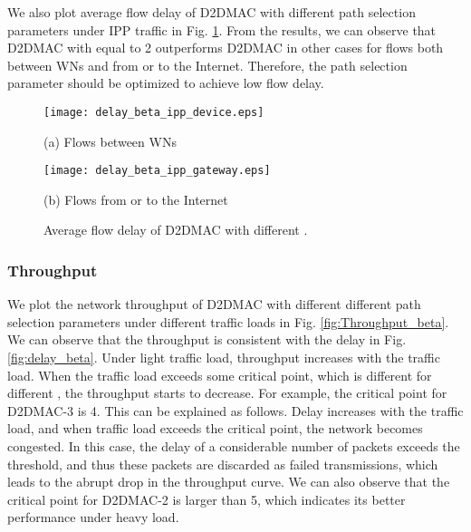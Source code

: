 \documentclass[journal]{IEEEtran}
\begin{document}
We also plot average flow delay of D2DMAC with different path selection parameters under IPP
traffic in Fig. \ref{fig:delay_beta_ipp_flow}. From the results, we can observe that D2DMAC with
 equal to 2 outperforms D2DMAC in other cases for flows both between WNs and from or to the
Internet. Therefore, the path selection parameter should be optimized to achieve low flow delay.




\begin{figure}[htbp]
\begin{minipage}[t]{0.5\linewidth}
\centering
\texttt{[image: delay\_beta\_ipp\_device.eps]}
\centerline{\small (a) Flows between WNs}
\end{minipage}\begin{minipage}[t]{0.5\linewidth}
\centering
\texttt{[image: delay\_beta\_ipp\_gateway.eps]}
\centerline{\small (b) Flows from or to the Internet}
\end{minipage}\caption{Average flow delay of D2DMAC with different .}
\label{fig:delay_beta_ipp_flow} \vspace*{-3mm}
\end{figure}











\subsubsection{Throughput}

We plot the network throughput of D2DMAC with different different path selection parameters under
different traffic loads in Fig. \ref{fig:Throughput_beta}. We can observe that the throughput is
consistent with the delay in Fig. \ref{fig:delay_beta}. Under light traffic load, throughput
increases with the traffic load. When the traffic load exceeds some critical point, which is
different for different , the throughput starts to decrease. For example, the critical point
for D2DMAC-3 is 4. This can be explained as follows. Delay increases with the traffic load, and
when traffic load exceeds the critical point, the network becomes congested. In this case, the
delay of a considerable number of packets exceeds the threshold, and thus these packets are
discarded as failed transmissions, which leads to the abrupt drop in the throughput curve. We can
also observe that the critical point for D2DMAC-2 is larger than 5, which indicates its better
performance under heavy load.
\end{document}
